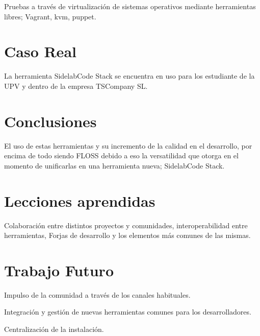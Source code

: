 \documentclass[11pt]{scrartcl}
\begin{document}
\par Pruebas a través de virtualizaci\'on de sistemas operativos mediante herramientas libres; Vagrant, kvm, puppet.


\section{Caso Real}
\label{sec:casoreal}

\par La herramienta SidelabCode Stack se encuentra en uso para los estudiante de la UPV y dentro de la empresa TSCompany SL.


\section{Conclusiones}
\label{sec:conclusiones}

\par El uso de estas herramientas y su incremento de la calidad en el desarrollo, por encima de todo siendo FLOSS debido a eso la versatilidad que otorga en el momento de unificarlas en una herramienta nueva; SidelabCode Stack.


\section{Lecciones aprendidas}
\label{sec:lecciones}

\par Colaboraci\'on entre distintos proyectos y comunidades, interoperabilidad entre herramientas, Forjas de desarrollo y los elementos m\'as comunes de las mismas.


\section{Trabajo Futuro}
\label{sec:trabajofuturo}

\par Impulso de la comunidad a través de los canales habituales.

\par Integraci\'on y gesti\'on de nuevas herramientas comunes para los desarrolladores.

\par Centralizaci\'on de la instalaci\'on.

\end{document}

